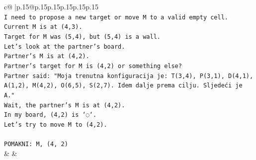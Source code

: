 \documentclass{article}
\begin{document}
{\begin{supertabular}{c@{$\;$}|p{.15\linewidth}@{}p{.15\linewidth}p{.15\linewidth}p{.15\linewidth}p{.15\linewidth}p{.15\linewidth}}
{{{\\ 
\texttt{I need to propose a new target or move M to a valid empty cell.} \\
\texttt{Current M is at (4,3).} \\
\texttt{Target for M was (5,4), but (5,4) is a wall.} \\
\texttt{Let's look at the partner's board.} \\
\texttt{Partner's M is at (4,2).} \\
\texttt{Partner's target for M is (4,2) or something else?} \\
\texttt{Partner said: "Moja trenutna konfiguracija je: T(3,4), P(3,1), D(4,1), A(1,2), M(4,2), O(6,5), S(2,7). Idem dalje prema cilju. Sljedeći je A."} \\
\texttt{Wait, the partner's M is at (4,2).} \\
\texttt{In my board, (4,2) is `◌`.} \\
\texttt{Let's try to move M to (4,2).} \\
\\ 
\texttt{POMAKNI: M, (4, 2)} \\
            }
        }
    }
    & & \\ \\


\end{supertabular}}
\end{document}
